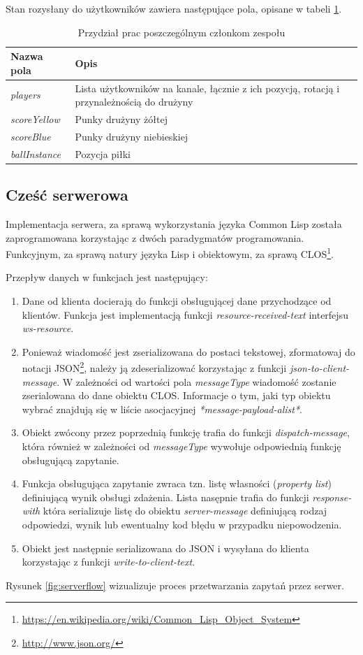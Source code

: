 Stan rozysłany do użytkowników zawiera następujące pola, opisane w tabeli \ref{tab:state-fields}.

\begin{table}[ht]
  \centering
  \begin{tabular}{ |p{3cm}|p{8cm}| }
    \hline
    \textbf{Nazwa pola} & \textbf{Opis} \\ \hline
    \emph{players} & Lista użytkowników na kanale, łącznie z ich pozycją, rotacją i przynależnością do drużyny \\
    \emph{scoreYellow} & Punky drużyny żółtej \\
    \emph{scoreBlue} & Punky drużyny niebieskiej \\
    \emph{ballInstance} & Pozycja piłki \\
    \hline
  \end{tabular}
  \caption{Przydział prac poszczególnym członkom zespołu}
  \label{tab:state-fields}
\end{table}

\subsection{Cześć serwerowa}
Implementacja serwera, za sprawą wykorzystania języka Common Lisp została zaprogramowana korzystając z dwóch paradygmatów programowania. Funkcyjnym, za sprawą natury języka Lisp i obiektowym, za sprawą CLOS\footnote{\url{https://en.wikipedia.org/wiki/Common_Lisp_Object_System}}.

Przepływ danych w funkcjach jest następujący:
\begin{enumerate}
\item Dane od klienta docierają do funkcji obsługującej dane przychodzące od klientów. Funkcja jest implementacją funkcji \emph{resource-received-text} interfejsu \emph{ws-resource}.
\item Ponieważ wiadomość jest zserializowana do postaci tekstowej, zformatowaj do notacji JSON\footnote{\url{http://www.json.org/}}, należy ją zdeserializować korzystając z funkcji \emph{json-to-client-message}. W zależności od wartości pola \emph{messageType} wiadomość zostanie zserialowana do dane obiektu CLOS. Informacje o tym, jaki typ obiektu wybrać znajdują się w liście asocjacyjnej \emph{*message-payload-alist*}.
\item Obiekt zwócony przez poprzednią funkcję trafia do funkcji \emph{dispatch-message}, która również w zależności od \emph{messageType} wywołuje odpowiednią funkcję obsługującą zapytanie.
\item Funkcja obsługująca zapytanie zwraca tzn. listę własności (\emph{property list}) definiującą wynik obsługi zdażenia. Lista nasępnie trafia do funkcji \emph{response-with} która serializuje listę do obiektu \emph{server-message} definiującą rodzaj odpowiedzi, wynik lub ewentualny kod błędu w przypadku niepowodzenia.
\item Obiekt jest następnie serializowana do JSON i wysyłana do klienta korzystając z funkcji \emph{write-to-client-text}.
\end{enumerate}
Rysunek \ref{fig:serverflow} wizualizuje proces przetwarzania zapytań przez serwer.

